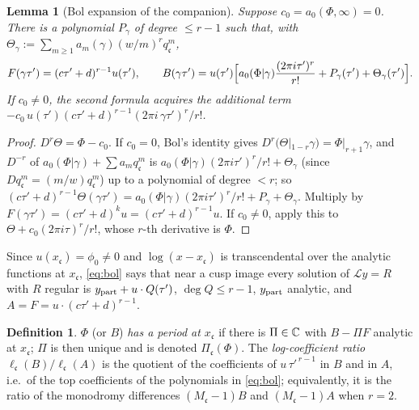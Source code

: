 \documentclass[11pt]{amsart}
\newtheorem{lemma}[theorem]{Lemma}
\theoremstyle{definition}
\newtheorem{definition}[theorem]{Definition}
\theoremstyle{remark}
\newcommand{\ct}{a_0}\renewcommand{\Re}{\operatorname{Re}}\renewcommand{\Im}{\operatorname{Im}}
\newcommand{\cc}{\mathfrak c}\newcommand{\Pc}{\Pi_{\cc}}\newcommand{\Pq}{\Pi^{q}}
\begin{document}
\begin{lemma}[Bol expansion of the companion]\label{lem:bol}
Suppose $c_0=\ct(\Phi,\infty)=0$. There is a polynomial $P_\gamma$ of degree $\le r-1$ such that, with $\Theta_\gamma:=\sum_{m\ge1}a_m(\gamma)(w/m)^rq_{\cc}^m$,
\begin{equation}\label{eq:bol}
F(\gamma\tau')=(c\tau'+d)^{r-1}u(\tau'),\qquad
B(\gamma\tau')=u(\tau')\Bigl[\ct(\Phi|\gamma)\frac{(2\pi i\tau')^r}{r!}+P_\gamma(\tau')+\Theta_\gamma(\tau')\Bigr].
\end{equation}
If $c_0\ne0$, the second formula acquires the additional term $-c_0\,u(\tau')(c\tau'+d)^{r-1}(2\pi i\,\gamma\tau')^r/r!$.
\end{lemma}
\begin{proof}
$D^r\Theta=\Phi-c_0$. If $c_0=0$, Bol's identity gives $D^r(\Theta|_{1-r}\gamma)=\Phi|_{r+1}\gamma$, and $D^{-r}$ of $\ct(\Phi|\gamma)+\sum a_mq_{\cc}^m$ is $\ct(\Phi|\gamma)(2\pi i\tau')^r/r!+\Theta_\gamma$ (since $Dq_{\cc}^m=(m/w)q_{\cc}^m$) up to a polynomial of degree $<r$; so $(c\tau'+d)^{r-1}\Theta(\gamma\tau')=\ct(\Phi|\gamma)(2\pi i\tau')^r/r!+P_\gamma+\Theta_\gamma$. Multiply by $F(\gamma\tau')=(c\tau'+d)^{k}u=(c\tau'+d)^{r-1}u$. If $c_0\ne0$, apply this to $\Theta+c_0(2\pi i\tau)^r/r!$, whose $r$-th derivative is $\Phi$.
\end{proof}

Since $u(x_{\cc})=\phi_0\ne0$ and $\log(x-x_{\cc})$ is transcendental over the analytic functions at $x_{\cc}$, \eqref{eq:bol} says that near a cusp image every solution of $\mathcal Ly=R$ with $R$ regular is $y_{\rm part}+u\cdot Q(\tau')$, $\deg Q\le r-1$, $y_{\rm part}$ analytic, and $A=F=u\cdot(c\tau'+d)^{r-1}$.

\begin{definition}\label{def:period}
$\Phi$ (or $B$) \emph{has a period at $x_{\cc}$} if there is $\Pi\in\mathbb C$ with $B-\Pi F$ analytic at $x_{\cc}$; $\Pi$ is then unique and is denoted $\Pc(\Phi)$. The \emph{log-coefficient ratio} $\ell_{\cc}(B)/\ell_{\cc}(A)$ is the quotient of the coefficients of $u\,\tau'^{\,r-1}$ in $B$ and in $A$, i.e.\ of the top coefficients of the polynomials in \eqref{eq:bol}; equivalently, it is the ratio of the monodromy differences $(M_{\cc}-1)B$ and $(M_{\cc}-1)A$ when $r=2$.
\end{definition}
\end{document}
